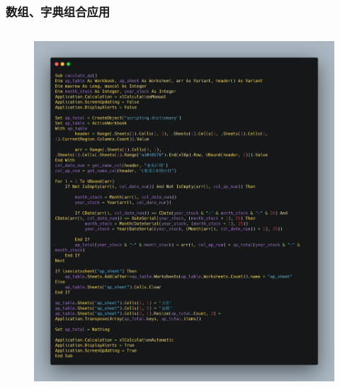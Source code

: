 \begin{frame}[fragile]
	\frametitle{数组、字典组合应用}
	\begin{columns}
		\begin{column}{\textwidth}
			\begin{figure}		
				\includegraphics[height=\textheight]{figures/arr_dic.png}
			\end{figure}
		\end{column}
	\end{columns}
\end{frame}


